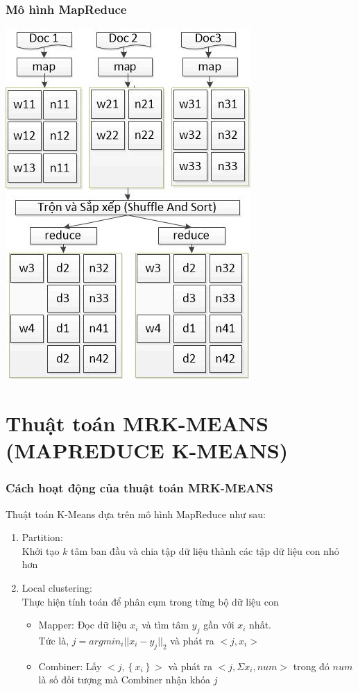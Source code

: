 \documentclass[12pt]{beamer}
\begin{document}
	\begin{frame}
		\frametitle{Mô hình MapReduce}
		\includegraphics[scale=0.9]{MapReduce.jpg}
	\end{frame}
	
	\section{Thuật toán MRK-MEANS (MAPREDUCE K-MEANS)}

	\begin{frame}
		\frametitle{Cách hoạt động của thuật toán MRK-MEANS}
		Thuật toán K-Means dựa trên mô hình MapReduce như sau:
		\begin{enumerate}[Bước 1:]
			\item Partition:\\
					Khởi tạo $k$ tâm ban đầu và chia tập dữ liệu thành các tập dữ liệu con nhỏ hơn
			\item Local clustering:\\
					Thực hiện tính toán để phân cụm trong từng bộ dữ liệu con\\
					\begin{itemize}
						\item Mapper: Đọc dữ liệu $x_i$ và tìm tâm $y_j$ gần với $x_i$ nhất.\\
								Tức là, $j = argmin_i || x_i - y_j ||_2$ và phát ra $<j, x_i>$
						\item Combiner: Lấy $<j, \left\{ x_i \right\}>$ và phát ra $<j, \Sigma x_i, num>$ trong đó $num$ là số đối tượng mà Combiner nhận khóa $j$
					\end{itemize}
		\end{enumerate}
	\end{frame}
\end{document}
